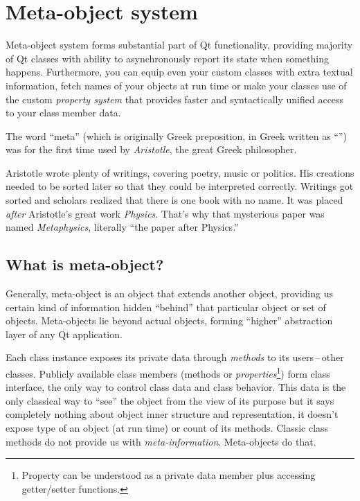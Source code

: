 \chapter{Meta-object system}
Meta-object system forms substantial part of Qt functionality, providing majority of Qt classes with ability to asynchronously report its state when something happens. Furthermore, you can equip even your custom classes with extra textual information, fetch names of your objects at run time or make your classes use of the custom \textit{property system} that provides faster and syntactically unified access to your class member data.

\begin{fdocextra}
The word \enquote{meta} (which is originally Greek preposition, in Greek written as \enquote{\textmu \textepsilon \texttau \textalpha}) was for the first time used by \textit{Aristotle}, the great Greek philosopher.

Aristotle wrote plenty of writings, covering poetry, music or politics. His creations needed to be sorted later so that they could be interpreted correctly. Writings got sorted and scholars realized that there is one book with no name. It was placed \textit{after} Aristotle's great work \textit{Physics}. That's why that mysterious paper was named \textit{Metaphysics}, literally \enquote{the paper after Physics.}
\end{fdocextra}

\section{What is meta-object?}
Generally, meta-object is an object that extends another object, providing us certain kind of information hidden \enquote{behind} that particular object or set of objects. Meta-objects lie beyond actual objects, forming \enquote{higher} abstraction layer of any Qt application.

Each class instance exposes its private data through \textit{methods} to its users\,--\,other classes. Publicly available class members (methods or \textit{properties}\footnote{Property can be understood as a private data member plus accessing getter/setter functions.}) form class interface, the only way to control class data and class behavior. This data is the only classical way to \enquote{see} the object from the view of its purpose but it says completely nothing about object inner structure and representation, \eg it doesn't expose type of an object (at run time) or count of its methods. Classic class methods do not provide us with \textit{meta-information}. Meta-objects do that.

